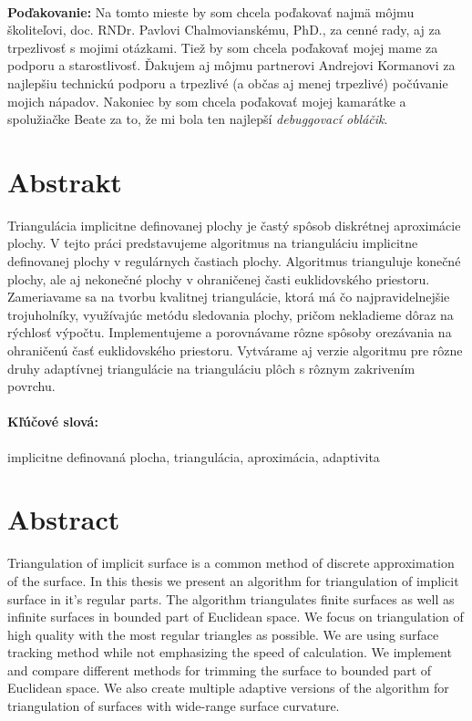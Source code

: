 \documentclass[12pt, twoside]{book}
\begin{document}

\frontmatter

\setcounter{page}{3}
\newpage 
~

\vfill
{\bf Poďakovanie:} Na tomto mieste by som chcela poďakovať najmä môjmu školiteľovi,
doc. RNDr. Pavlovi Chalmovianskému, PhD., za cenné rady, aj za trpezlivosť s mojimi 
otázkami. Tiež by som chcela poďakovať mojej mame za podporu a starostlivosť. 
Ďakujem aj môjmu partnerovi Andrejovi 
Kormanovi za najlepšiu technickú podporu a trpezlivé (a občas aj menej trpezlivé) 
počúvanie mojich nápadov. Nakoniec by som chcela poďakovať mojej kamarátke a spolužiačke
Beate za to, že mi bola ten najlepší \textit{debuggovací obláčik}.


\newpage 
\section*{Abstrakt}

Triangulácia implicitne definovanej plochy je častý spôsob diskrétnej aproximácie
plochy. V tejto práci predstavujeme algoritmus na trianguláciu implicitne definovanej plochy
v regulárnych častiach plochy. Algoritmus trianguluje
konečné plochy, ale aj nekonečné plochy v ohraničenej časti euklidovského priestoru. 
Zameriavame sa na tvorbu kvalitnej triangulácie, ktorá má čo najpravidelnejšie
trojuholníky, využívajúc metódu sledovania plochy, pričom nekladieme dôraz na rýchlosť výpočtu. 
Implementujeme a porovnávame rôzne spôsoby orezávania na ohraničenú časť euklidovského priestoru. 
Vytvárame aj verzie algoritmu pre rôzne druhy adaptívnej triangulácie na trianguláciu plôch s rôznym 
zakrivením povrchu.

\paragraph*{Kľúčové slová:} implicitne definovaná plocha, triangulácia, aproximácia, adaptivita


\newpage 
\section*{Abstract}

Triangulation of implicit surface is a common method of discrete approximation of the surface.
In this thesis we present an algorithm for triangulation of implicit surface in it's regular 
parts. The algorithm triangulates finite surfaces as well as infinite surfaces in bounded part
of Euclidean space. We focus on triangulation of high quality with the most regular triangles as 
possible. We are using surface tracking method while not emphasizing the speed of calculation.
We implement and compare different methods for trimming the surface to bounded part of Euclidean 
space. We also create multiple adaptive versions of the algorithm for triangulation of surfaces 
with wide-range surface curvature.  
\end{document}
